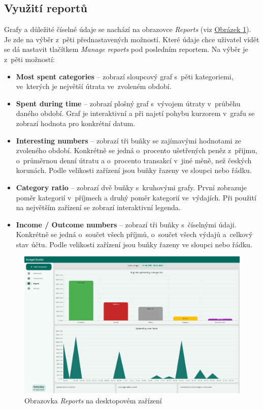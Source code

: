 \documentclass[
  biblatex,
  figures=true,
  tables=false,
  glossaries,
  index
]{kidiplom}
\begin{document}
\subsection{Využití reportů}
Grafy a důležité číselné údaje se nachází na obrazovce \textit{Reports} (viz \hyperref[fig:reports]{Obrázek \ref{fig:reports}}). Je zde na výběr z~pěti přednastavených možností. Které údaje chce uživatel vidět se dá nastavit tlačítkem \textit{Manage reports} pod posledním reportem. Na výběr je z~pěti možností:
\begin{itemize}
  \item \textbf{Most spent categories} -- zobrazí sloupcový graf s~pěti kategoriemi, ve~kterých je největší útrata ve~zvoleném období.
  \item \textbf{Spent during time} -- zobrazí plošný graf s~vývojem útraty v~průběhu daného období. Graf je interaktivní a při najetí pohybu kurzorem v~grafu se zobrazí hodnota pro konkrétní datum.
  \item \textbf{Interesting numbers} -- zobrazí tři buňky se zajímavými hodnotami ze zvoleného období. Konkrétně se jedná o~procento ušetřených peněz z~přijmu, o~průměrnou denní útratu a o~procento transakcí v~jiné měně, než českých korunách. Podle velikosti zařízení jsou buňky řazeny ve sloupci nebo řádku.
  \item \textbf{Category ratio} -- zobrazí dvě buňky s~kruhovými grafy. První zobrazuje poměr kategorií v~příjmech a druhý poměr kategorií ve~výdajích. Při použití na největším zařízení se zobrazí interaktivní legenda.
  \item \textbf{Income / Outcome numbers} -- zobrazí tři buňky s~číselnými údaji. Konkrétně se jedná o~součet všech příjmů, o~součet všech výdajů a~celkový stav účtu. Podle velikosti zařízení jsou buňky řazeny ve sloupci nebo řádku.
\end{itemize}

\begin{figure}
  \centering
  \includegraphics[width=\textwidth]{images/reports-large.png}
  \caption{Obrazovka \textit{Reports} na desktopovém zařízení}
  \label{fig:reports}
\end{figure}
\end{document}
